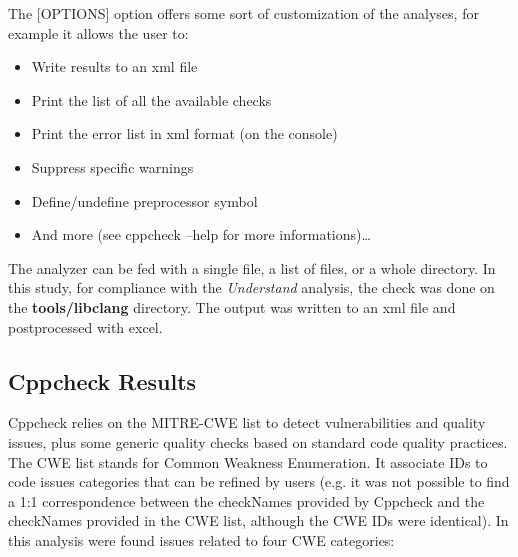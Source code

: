The [OPTIONS] option offers some sort of customization of the analyses, for example it allows the user to:
\begin{itemize}
	\item Write results to an xml file
	\item Print the list of all the available checks
	\item Print the error list in xml format (on the console)
	\item Suppress specific warnings
	\item Define/undefine preprocessor symbol
	\item And more (see cppcheck --help for more informations)\dots
\end{itemize}
The analyzer can be fed with a single file, a list of files, or a whole directory. In this study, for compliance with the \textsl{Understand} analysis, the check was done on the \textbf{tools/libclang} directory.\newline
The output was written to an xml file and postprocessed with excel.

\subsection{Cppcheck Results}

Cppcheck relies on the MITRE-CWE list to detect vulnerabilities and quality issues, plus some generic quality checks based on standard code quality practices.\newline
The CWE list stands for Common Weakness Enumeration. It associate IDs to code issues categories that can be refined by users (e.g. it was not possible to find a 1:1 correspondence between the checkNames provided by Cppcheck and the checkNames provided in the CWE list, although the CWE IDs were identical).
\newline In this analysis were found issues related to four CWE categories:

